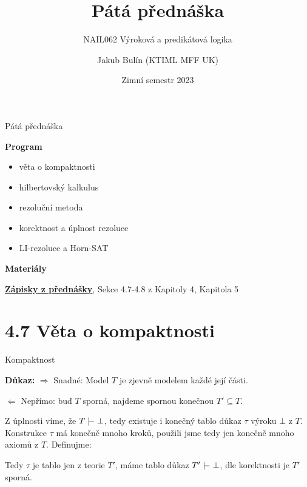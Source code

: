 \documentclass{beamer}
\title{Pátá přednáška}
\subtitle{NAIL062 Výroková a predikátová logika}
\author{Jakub Bulín (KTIML MFF UK)}
\date{Zimní semestr 2023}
\begin{document}
\frame{\titlepage}


\begin{frame}{Pátá přednáška}

    \textbf{Program}
        \begin{itemize}
            \item věta o kompaktnosti
            \item hilbertovský kalkulus
            \item rezoluční metoda
            \item korektnost a úplnost rezoluce
            \item LI-rezoluce a Horn-SAT
        \end{itemize}

    \textbf{Materiály}

        \href{https://github.com/jbulin-mff-uk/nail062/raw/main/lecture/lecture-notes/lecture-notes.pdf}{\alert{\textbf{Zápisky z přednášky}}}, Sekce 4.7-4.8 z Kapitoly 4, Kapitola 5

\end{frame}


\section{4.7 Věta o kompaktnosti}


\begin{frame}{Kompaktnost}

    \smallskip

    \textbf{Důkaz:} \alert{$\Rightarrow$ Snadné:} Model $T$ je zjevně modelem každé její části.
    
    \alert{$\Leftarrow$ Nepřímo:} buď $T$ sporná, najdeme spornou konečnou $T'\subseteq T$.

    Z \alert{úplnosti} víme, že $T\proves\bot$, tedy existuje i \alert{konečný} tablo důkaz $\tau$ výroku $\bot$ z $T$. Konstrukce $\tau$ má konečně mnoho kroků, použili jsme tedy jen konečně 
    mnoho axiomů z $T$. Definujme:
    

    Tedy $\tau$ je tablo jen z teorie $T'$, máme tablo důkaz $T'\proves\bot$, dle \alert{korektnosti} je $T'$ sporná.\hfill\qedsymbol

\end{frame}
\end{document}
